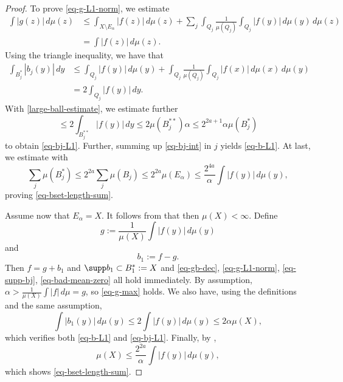 \begin{proof}
To prove \eqref{eq-g-L1-norm}, we estimate
\begin{align*}
    \int |g(z)|\, d\mu(z) &\le \int_{X\setminus E_\alpha} |f(z)|\, d\mu(z) + \sum_{j} \int_{Q_j}\frac{1}{\mu(Q_j)}\int_{Q_j}|f(y)|\, d\mu(y)\,d\mu(z) \\
    &= \int |f(z)|\,d\mu(z).
\end{align*}
Using the triangle inequality, we have that
\begin{align}
    \label{eq-bj-int}
    \int_{B_j^*} |b_j(y)|\, dy &\le \int_{Q_j} |f(y)|\, d\mu(y) + \int_{Q_j} \frac{1}{\mu(Q_j)}\int_{Q_j} |f(x)|\, d\mu(x)\, d\mu(y) \\
    &= 2 \int_{Q_j} |f(y)|\, dy.
\end{align}
With \eqref{large-ball-estimate}, we estimate further
\begin{equation}
    \le 2 \int_{B_j^{**}} |f(y)|\, dy \le 2\mu(B_j^{**})\alpha \le 2^{2a+1} \alpha \mu(B_j^*)
\end{equation}
to obtain \eqref{eq-bj-L1}.
Further, summing up \eqref{eq-bj-int} in $j$ yields \eqref{eq-b-L1}.
At last, we estimate with 
\begin{equation}
    \sum_j \mu(B_j^*) \le 2^{2a} \sum_j \mu(B_j) \le 2^{2a} \mu(E_\alpha) \le \frac{2^{4a}}{\alpha}\int |f(y)|\, d\mu(y),
\end{equation}
proving \eqref{eq-bset-length-sum}.

Assume now that $E_\alpha = X$. It follows from  that then $\mu(X)<\infty$.
Define
\begin{equation*}
    g := \frac{1}{\mu(X)} \int |f(y)|\,d\mu(y)
\end{equation*}
and
\begin{equation*}
    b_1 := f - g.
\end{equation*}
Then $f = g + b_1$ and $\supp b_1 \subset B_1^*:=X$ and \eqref{eq-gb-dec}, \eqref{eq-g-L1-norm}, \eqref{eq-supp-bj}, \eqref{eq-bad-mean-zero} all hold immediately. By assumption, $\alpha>\frac{1}{\mu(X)}\int |f|\,d\mu = g$, so \eqref{eq-g-max} holds.
We also have, using the definitions and the same assumption,
\begin{equation}
    \int |b_1(y)|\, d\mu(y) \le 2 \int |f(y)|\,d\mu(y) \le 2\alpha\mu(X),
\end{equation}
which verifies both \eqref{eq-b-L1} and \eqref{eq-bj-L1}.
Finally, by ,
\begin{equation*}
    \mu(X) \le \frac{2^{2a}}{\alpha} \int |f(y)|\,d\mu(y),
\end{equation*}
which shows \eqref{eq-bset-length-sum}.
\end{proof}

